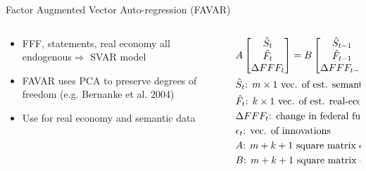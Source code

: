 \documentclass{beamer}
\begin{document}
\begin{frame}{Factor Augmented Vector Auto-regression (FAVAR)}
	
	\begin{columns}
		\begin{column}{0.48\textwidth}
			\begin{itemize}
				\item FFF, statements, real economy all endogenous\quad $\Rightarrow$ SVAR model
				\item FAVAR uses PCA to preserve degrees of freedom (e.g. Bernanke et al. 2004)
				\item Use for real economy and semantic data
			\end{itemize}
		\end{column}
		\begin{column}{0.5\textwidth}
			 \scriptsize\begin{align}
			&A\begin{bmatrix}
			\hat{S}_t\\\hat{F}_t\\\-\Delta FFF_t
			\end{bmatrix} =
			B\begin{bmatrix}
			\hat{S}_{t-1}\\\hat{F}_{t-1}\\\Delta FFF_{t-1}
			\end{bmatrix} + \epsilon_t \nonumber \\
			&\hat{S}_t\text{: $m\times1$ vec. of est. semantic factors} \nonumber \\
			&\hat{F}_t\text{: $k\times1$ vec. of est. real-economic factors} \nonumber \\
			&\Delta FFF_t\text{: change in federal funds futures rate} \nonumber \\
			&\epsilon_t\text{: vec. of innovations} \nonumber \\
			&A\text{: $m+k+1$ square matrix of contemp. coeff.} \nonumber \\
			&B\text{: $m+k+1$ square matrix of lag coeff.} \nonumber
			\end{align}
		\end{column}
	\end{columns}
\end{frame}
\end{document}
